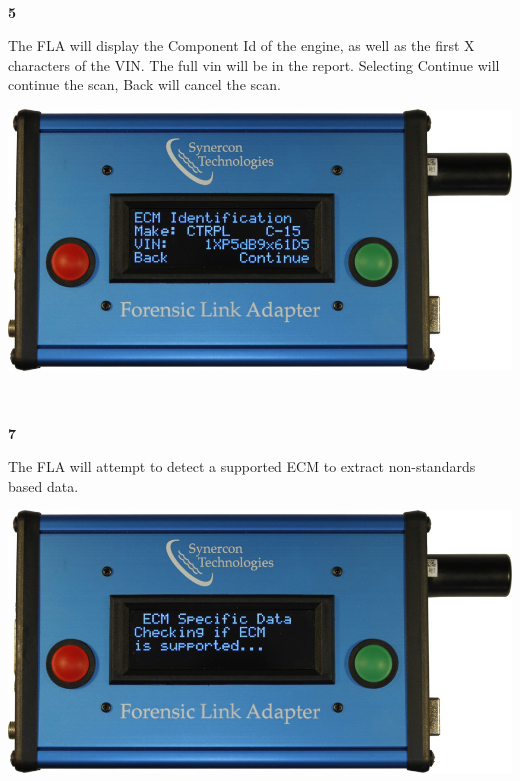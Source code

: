 \documentclass[11pt, oneside]{book}
\begin{document}
\\[\baselineskip]
\noindent\begin{minipage}{0.45\textwidth}%
\begin{center}
\textbf{5}\\[\baselineskip]
\end{center}
The FLA will display the Component Id of the engine, as well as the first X characters of the VIN. The full vin will be in the report. Selecting Continue will continue the scan, Back will cancel the scan.
\end{minipage}%
\hfill%
\begin{minipage}{0.45\textwidth}
\includegraphics[width=\linewidth]{../media/fla_screens/ethernet_and_others/veh_scan/comp_id}
\end{minipage}
\\[\baselineskip]
\noindent\begin{minipage}{0.45\textwidth}%
\begin{center}
\textbf{7}\\[\baselineskip]
\end{center}
The FLA will attempt to detect a supported ECM to extract non-standards based data.
\end{minipage}%
\hfill%
\begin{minipage}{0.45\textwidth}
\includegraphics[width=\linewidth]{../media/fla_screens/ethernet_and_others/veh_scan/check_ecm}
\end{minipage}
\end{document}
